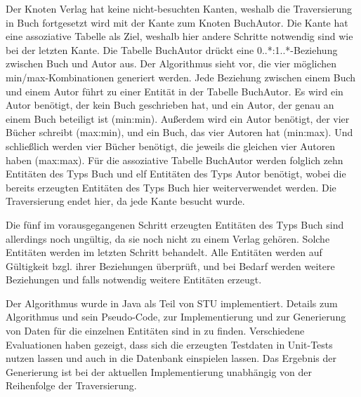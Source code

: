   Der Knoten Verlag hat keine nicht-besuchten Kanten, weshalb die Traversierung in Buch fortgesetzt wird mit der Kante zum Knoten
	BuchAutor. Die Kante hat eine assoziative Tabelle als Ziel, weshalb hier andere Schritte notwendig sind wie bei der letzten Kante.
	Die Tabelle BuchAutor drückt eine 0..*:1..*-Beziehung zwischen Buch und Autor aus. Der Algorithmus sieht vor, die vier möglichen
	min/max-Kombinationen generiert werden. Jede Beziehung zwischen einem Buch und einem Autor führt zu einer Entität in der Tabelle
	BuchAutor. Es wird ein Autor benötigt, der kein Buch geschrieben hat, und ein Autor, der genau an einem
	Buch beteiligt ist (min:min). Außerdem wird ein Autor benötigt, der vier Bücher schreibt (max:min), und ein Buch, das vier Autoren
	hat (min:max). Und schließlich werden vier Bücher benötigt, die jeweils die gleichen vier Autoren haben (max:max). Für die assoziative
	Tabelle BuchAutor werden folglich zehn Entitäten des Typs Buch und elf Entitäten des Typs Autor benötigt, wobei die bereits erzeugten
	Entitäten des Typs Buch hier weiterverwendet werden. Die Traversierung endet hier, da jede Kante besucht wurde.
	
	Die fünf im vorausgegangenen Schritt erzeugten Entitäten des Typs Buch sind allerdings noch ungültig, da sie noch nicht zu einem Verlag
	gehören. Solche Entitäten werden im letzten Schritt behandelt. Alle Entitäten werden auf Gültigkeit bzgl. ihrer Beziehungen überprüft,
	und bei Bedarf werden weitere Beziehungen und falls notwendig weitere Entitäten erzeugt.
	
	Der Algorithmus wurde in Java als Teil von STU implementiert. Details zum Algorithmus und sein Pseudo-Code, zur Implementierung und zur
	Generierung von Daten für die einzelnen Entitäten sind in \cite{MT:Moll:2013} zu finden. Verschiedene Evaluationen haben gezeigt, dass
	sich die erzeugten Testdaten in Unit-Tests nutzen lassen und auch in die Datenbank einspielen lassen. Das Ergebnis der Generierung ist
	bei der aktuellen Implementierung unabhängig von der Reihenfolge der Traversierung.
	
	

